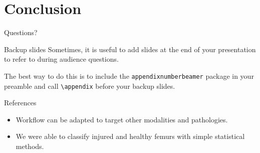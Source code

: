 \documentclass[10pt]{beamer}
\begin{document}
\section{Conclusion}

\begin{frame}[standout]
  Questions?
\end{frame}

\appendix

\begin{frame}[fragile]{Backup slides}
  Sometimes, it is useful to add slides at the end of your presentation to
  refer to during audience questions.

  The best way to do this is to include the \verb|appendixnumberbeamer|
  package in your preamble and call \verb|\appendix| before your backup slides.

\end{frame}

\begin{frame}[allowframebreaks]{References}

  
  

  \begin{itemize} \itemsep1.0em
    \item Workflow can be adapted to target other modalities and pathologies.
    \item We were able to classify injured and healthy femurs with simple statistical methods.
  \end{itemize}
\end{frame}
\end{document}

